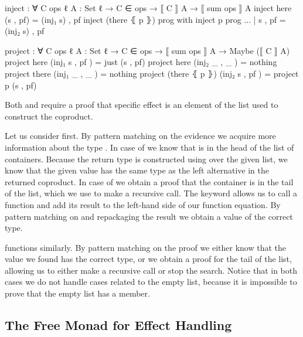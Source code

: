 \begin{code}
inject : ∀ {C ops ℓ} {A : Set ℓ} → C ∈ ops → ⟦ C ⟧ A → ⟦ sum ops ⟧ A
inject here           (s , pf)  = (inj₁ s) , pf
inject (there ⦃ p ⦄)  prog      with inject p prog
... | s , pf = (inj₂ s) , pf

project : ∀ {C ops ℓ} {A : Set ℓ} → C ∈ ops → ⟦ sum ops ⟧ A → Maybe (⟦ C ⟧ A)
project here           (inj₁ s  , pf  )  = just (s , pf)
project here           (inj₂ _  , _   )  = nothing
project there          (inj₁ _  , _   )  = nothing
project (there ⦃ p ⦄)  (inj₂ s  , pf  )  = project p (s , pf)
\end{code}
Both  and  require a proof that
specific effect is an element of the list used to construct the coproduct.

Let us consider  first.
By pattern matching on the evidence we acquire more information about the type
\AgdaSpace{}.
In case of  we know that  is in
the head of the list of containers.
Because the return type is constructed using  over the given
list, we know that the given value
\AgdaSpace{}\AgdaInductiveConstructor{,}\AgdaSpace{}
has the same type as the left alternative in the returned coproduct.
In case of  we obtain a proof that the container
is in the tail of the list, which we use to make a recursive call.
The  keyword allows us to call a function and add its result
to the left-hand side of our function equation. %
By pattern matching on and repackaging the result we obtain a value of the
correct type.

 functions similarly.
By pattern matching on the proof we either know that the value we found has
the correct type, or we obtain a proof for the tail of the list, allowing us to
either make a recursive call or stop the search.
Notice that in both cases we do not handle cases related to the empty list,
because it is impossible to prove that the empty list has a member.


\subsection{The Free Monad for Effect Handling}
\label{first-order:free-monad}

